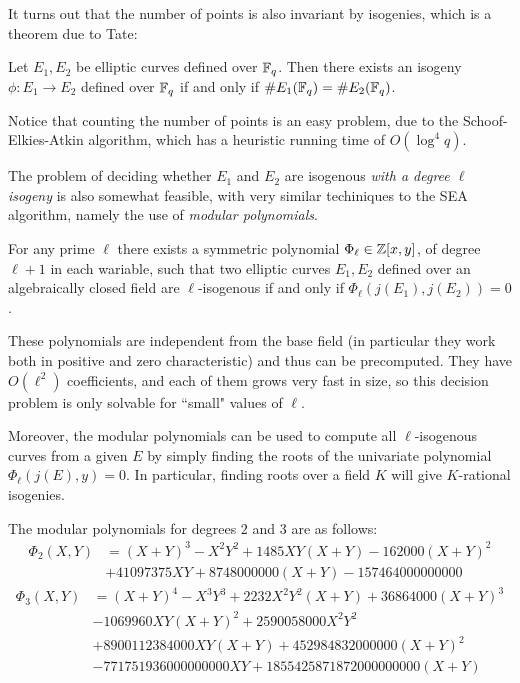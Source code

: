 It turns out that the number of points is also invariant by isogenies, which is a theorem due to Tate:
\begin{theorem}
    Let $E_1,E_2$ be elliptic curves defined over $\mathbb{F}_q$. Then there exists an isogeny $\phi: E_1\to E_2$ defined over $\mathbb{F}_q$ if and only if $\# E_1(\mathbb{F}_q)=\# E_2(\mathbb{F}_q)$.
\end{theorem}

Notice that counting the number of points is an easy problem, due to the Schoof-Elkies-Atkin algorithm, which has a heuristic running time of $O(\log^4 q)$.

The problem of deciding whether $E_1$ and $E_2$ are isogenous \emph{with a degree $\ell$ isogeny} is also somewhat feasible, with very similar techiniques to the SEA algorithm, namely the use of \emph{modular polynomials}.

\begin{theorem}
    For any prime $\ell$ there exists a symmetric polynomial $\Phi_\ell\in\mathbb{Z}[x,y]$, of degree $\ell+1$ in each wariable, such that two elliptic curves $E_1,E_2$ defined over an algebraically closed field are $\ell$-isogenous if and only if $\Phi_\ell(j(E_1),j(E_2))=0$.
\end{theorem}

These polynomials are independent from the base field (in particular they work both in positive and zero characteristic) and thus can be precomputed. They have $O(\ell^2)$ coefficients, and each of them grows very fast in size, so this decision problem is only solvable for ``small" values of $\ell$.

Moreover, the modular polynomials can be used to compute all $\ell$-isogenous curves from a given $E$ by simply finding the roots of the univariate polynomial $\Phi_\ell(j(E),y)=0$. In particular, finding roots over a field $K$ will give $K$-rational isogenies.

\begin{example}
    The modular polynomials for degrees $2$ and $3$ are as follows:
    \begin{align*}
    \Phi_2(X,Y) &= (X+Y)^3-X^2Y^2+1485XY(X+Y)-162000(X+Y)^2 \\
    & + 41097375 XY + 8748000000(X+Y) - 157464000000000
    \end{align*}
    \begin{align*}
    \Phi_3(X,Y) &= (X+Y)^4 - X^3Y^3 + 2232X^2Y^2(X+Y) + 36864000(X+Y)^3\\
    & - 1069960XY(X+Y)^2 + 2590058000X^2Y^2\\
    & + 8900112384000XY(X+Y) + 452984832000000(X+Y)^2\\
    & - 771751936000000000XY + 1855425871872000000000(X+Y)
    \end{align*}
\end{example}

